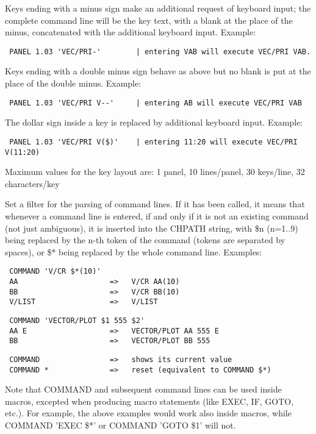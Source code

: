 Keys ending with a minus sign make an additional request of keyboard input;
the complete command line will be the key text, with a blank at the place
of the minus, concatenated with the additional keyboard input. Example:
\begin{verbatim}
 PANEL 1.03 'VEC/PRI-'        | entering VAB will execute VEC/PRI VAB.
\end{verbatim}
Keys ending with a double minus sign behave as above but no blank is put
at the place of the double minus. Example:
\begin{verbatim}
 PANEL 1.03 'VEC/PRI V--'     | entering AB will execute VEC/PRI VAB
\end{verbatim}
The dollar sign inside a key is replaced by additional keyboard input. Example:
\begin{verbatim}
 PANEL 1.03 'VEC/PRI V($)'    | entering 11:20 will execute VEC/PRI V(11:20)
\end{verbatim}
Maximum values for the key layout are:
1 panel, 10 lines/panel, 30 keys/line, 32 characters/key
\ENDTEXT

\BEGARG
{}
\ENDARG
\BEGTEXT
Set a filter for the parsing of command lines.
If it has been called, it means that whenever a command line is entered,
if and only if it is not an existing command (not just ambiguous),
it is inserted into the CHPATH string, with \$n (n=1..9) being replaced
by the n-th token of the command (tokens are separated by spaces),
or \$* being replaced by the whole command line. Examples:
\begin{verbatim}
 COMMAND 'V/CR $*(10)'
 AA                     =>   V/CR AA(10)
 BB                     =>   V/CR BB(10)
 V/LIST                 =>   V/LIST
\end{verbatim}

\begin{verbatim}
 COMMAND 'VECTOR/PLOT $1 555 $2'
 AA E                   =>   VECTOR/PLOT AA 555 E
 BB                     =>   VECTOR/PLOT BB 555
\end{verbatim}

\begin{verbatim}
 COMMAND                =>   shows its current value
 COMMAND *              =>   reset (equivalent to COMMAND $*)
\end{verbatim}
Note that COMMAND and subsequent command lines can be used inside macros,
excepted when producing macro statements (like EXEC, IF, GOTO, etc.).
For example, the above examples would work also inside macros, while
COMMAND 'EXEC \$*' or COMMAND 'GOTO \$1' will not.

